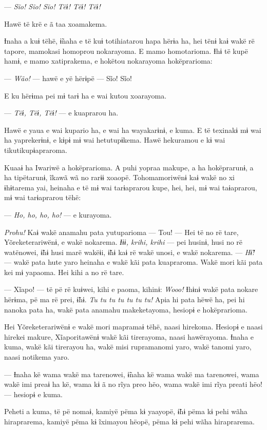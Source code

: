 --- \textit{Sĩo! Sĩo! Sĩo! Tëɨ! Tëɨ! Tëɨ!} 

Hawë të krë e ã taa xoamakema. 

Ɨnaha a kuɨ tëhë, ɨ̃naha e të kuɨ totihiatarou hapa hërɨa ha, hei tënɨ
kaɨ wakë rë tapore, mamokasi homoprou nokarayoma. E mamo homotarioma.
Ɨhɨ të kupë hamɨ, e mamo xatiprakema, e hokëtou nokarayoma hokëprarioma:

--- \textit{Wão!} --- hawë e yë hërɨpë --- Sĩo! Sĩo! 

E ku hërɨma pei mɨ tarɨ ha e wai kutou xoarayoma. 

--- \textit{Tëɨ, Tëɨ, Tëɨ!} --- e kuaprarou ha. 

Hawë e yaua e wai kupario ha, e wai ha wayakarɨnɨ, e kuma. E të texinakɨ
mɨ wai ha yaprekerɨnɨ, e kɨpɨ mɨ wai hetutupɨkema. Hawë hekuramou e kɨ
wai tikutikupɨapraroma. 

Kuaaɨ ha Iwariwë a hokëprarioma. A puhi yopraa makupe, a ha hokëprarunɨ,
 a ha tipëtarunɨ, ĩkawã wã no rarɨɨ xoaopë. Tohomamoriwënɨ kaɨ wakë no xi
 ɨhɨtarema yai, heinaha e të mɨ wai tarɨaprarou kupe, hei, hei, mɨ wai
 taɨaprarou, mɨ wai tarɨaprarou tëhë:

--- \textit{Ho, ho, ho, ho!} --- e kurayoma. 

\textit{Prohu!} Kaɨ wakë anamahu pata yutuparioma --- Tou! --- Hei të no rë tare,
Yõreketerariwënɨ, e wakë nokarema. \textit{Ɨɨɨ, krihi, krihi} --- pei husinɨ,
husi no rë watënowei, ɨ̃hɨ husi marë wakëɨi, ɨ̃hɨ kaɨ rë wakë unosi, e wakë
nokarema. --- \textit{Hɨ̃!} --- wakë pata hute yaro heinaha e wakë kãi pata
kuapraroma. Wakë mori kãi pata kei mɨ yapaoma. Hei kihi a no rë tare. 

--- Xĩapo! --- të pë rë kuɨwei, kihi e paoma, kihinɨ: \textit{Wooo!} Ɨhɨnɨ wakë
pata nokare hërɨma, pë ma rë prei, ɨ̃hɨ. \textit{Tu tu tu tu tu tu tu!} Apia hi
pata hëwë ha, pei hi nanoka pata ha, wakë pata anamahu makeketayoma,
hesiopɨ e hokëprarioma. 

Hei Yõreketerariwënɨ e wakë mori mapramaɨ tëhë, naasi hirekoma. Hesiopɨ
 e naasi hirekei makure, Xĩaporitawënɨ wakë kãi tirerayoma, naasi
 hawërayoma. Ɨnaha e kuma, wakë kãi tirerayou ha, wakë misi rupramanomi
 yaro, wakë tanomi yaro, naasi notikema yaro. 

--- Ɨnaha kë wama wakë ma tarenowei, ɨ̃naha kë wama wakë ma tarenowei,
wama wakë imi preaɨ ha kë, wama kɨ ã no rĩya preo hëo, wama wakë imi
rĩya preati hëo! --- hesiopɨ e kuma. 

Peheti a kuma, të pë nomaɨ, kamiyë pëma kɨ yaayopë, ɨ̃hɨ pëma kɨ pehi
wãha hiraprarema, kamiyë pëma kɨ ĩximayou hëopë, pëma kɨ pehi wãha
hiraprarema. 


